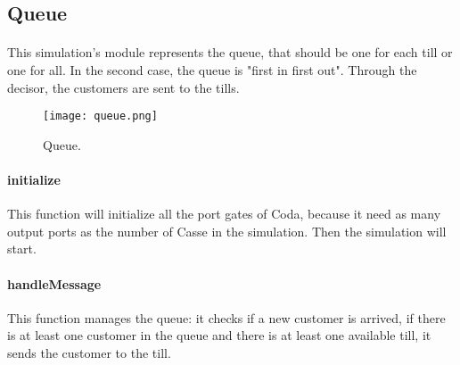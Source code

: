 \subsection{Queue}
\paragraph{} This simulation's module represents the queue, that should be one for each till or one for all. In the second case, the queue is "first in first out". Through the decisor, the customers are sent to the tills. 
\begin{figure}[h]
  \begin{center}
  \texttt{[image: queue.png]}
  \caption{Queue.}
  \label{fig:que}
  \end{center}
\end{figure}

\paragraph{initialize} This function will initialize all the port gates of Coda, because it need as many output ports as the number of Casse in the simulation. Then the simulation will start.

\paragraph{handleMessage} This function manages the queue: it checks if a new customer is arrived, if there is at least one customer in the queue and there is at least one available till, it sends the customer to the till.
